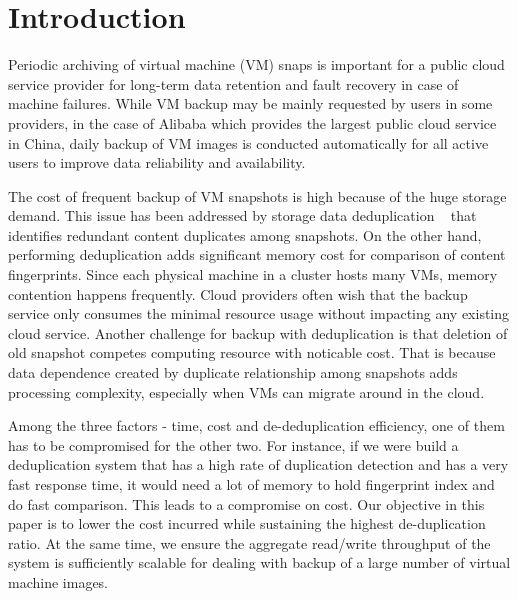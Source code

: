\section{Introduction}



Periodic  archiving of virtual machine (VM) snaps is important for a public cloud service provider
for long-term data  retention and fault recovery in case of machine failures.  
While VM backup  may  be mainly requested by users  in some providers,  
in the case of Alibaba which provides the largest public cloud service in China,
daily backup of VM images  is conducted automatically for all  active users 
to improve data reliability and availability. 

The cost of frequent backup of VM snapshots is  high because of the huge storage demand.
This issue has been addressed by   storage data deduplication ~\cite{venti02,bottleneck08} that
identifies redundant content duplicates among snapshots.  On the other hand, performing
deduplication adds significant  memory cost for comparison of content fingerprints. 
Since each physical machine in a cluster  hosts many VMs, memory contention happens frequently. 
Cloud providers often wish that the backup service only consumes  the minimal resource usage without 
impacting any existing cloud service.  Another challenge for backup with deduplication is that deletion 
of old snapshot competes computing resource with noticable cost. That is because data dependence created 
by duplicate relationship among snapshots  adds processing complexity, especially when  
VMs can migrate around in the cloud. 

Among the three factors - time, cost and de-deduplication efficiency, one of them has to be compromised for the other two. For instance, if we were build a deduplication system that has a high rate of duplication detection and has a very fast response time, 
it would need a lot of memory to hold fingerprint index and do fast comparison.  This leads to a compromise on cost. 
Our objective in this paper is to lower the cost incurred while sustaining the highest de-duplication ratio. 
At the same time, we ensure the aggregate read/write throughput of the system 
is sufficiently scalable  for dealing with backup of a large number of virtual machine images. 

